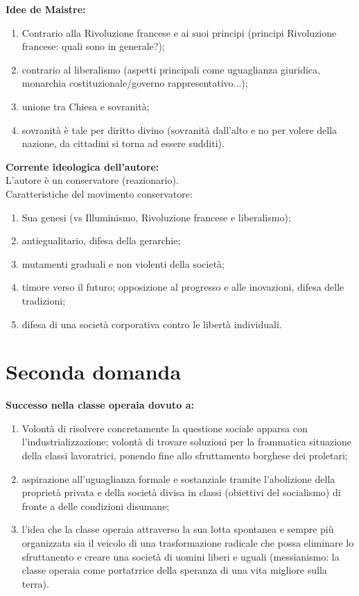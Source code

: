 \documentclass[a4paper]{article}
\begin{document}
\textbf{Idee de Maistre:}
\begin{enumerate}
    \item Contrario alla Rivoluzione francese e ai suoi principi (principi Rivoluzione francese: quali sono in generale?);
    \item contrario al liberalismo (aspetti principali come uguaglianza giuridica, monarchia costituzionale/governo rappresentativo...);
    \item unione tra Chiesa e sovranità;
    \item sovranità è tale per diritto divino (sovranità dall'alto e no per volere della nazione, da cittadini si torna ad essere sudditi).
\end{enumerate}

\textbf{Corrente ideologica dell'autore:} \\
L'autore è un conservatore (reazionario). \\
Caratteristiche del movimento conservatore:
\begin{enumerate}
    \item Sua genesi (vs Illuminismo, Rivoluzione francese e liberalismo);
    \item antiegualitario, difesa della gerarchie;
    \item mutamenti graduali e non violenti della società;
    \item timore verso il futuro; opposizione al progresso e alle inovazioni, difesa delle tradizioni;
    \item difesa di una società corporativa contro le libertà individuali.
\end{enumerate}

\section{Seconda domanda}

\textbf{Successo nella classe operaia dovuto a:}
\begin{enumerate}
    \item Volontà di risolvere concretamente la questione sociale apparsa con l'industrializzazione; volontà di trovare soluzioni per la frammatica situazione della classi lavoratrici, ponendo fine allo sfruttamento borghese dei proletari;
    \item aspirazione all'uguaglianza formale e sostanziale tramite l'abolizione della proprietà privata e della società divisa in classi (obiettivi del socialismo) di fronte a delle condizioni disumane;
    \item l'idea che la classe operaia attraverso la sua lotta spontanea e sempre più organizzata sia il veicolo di una trasformazione radicale che possa eliminare lo sfruttanento e creare una società di uomini liberi e uguali (messianismo: la classe operaia come portatrrice della speranza di una vita migliore sulla terra).
\end{enumerate}
\end{document}
